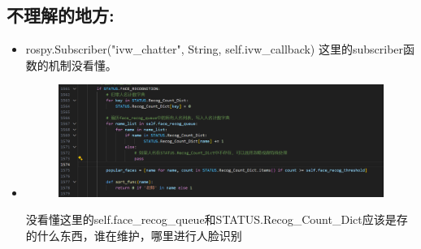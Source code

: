 \documentclass[]{article}
\begin{document}
\subsection{\textcolor{mycolor}{不理解的地方:}}
\begin{itemize}
	\item rospy.Subscriber("ivw\_chatter", String, self.ivw\_callback) 这里的subscriber函数的机制没看懂。
	\item \begin{figure}[h]
		\centering
		\includegraphics[width=0.7\linewidth]{screenshot002}
		\label{fig:screenshot002}
	\end{figure}
	没看懂这里的self.face\_recog\_queue和STATUS.Recog\_Count\_Dict应该是存的什么东西，谁在维护，哪里进行人脸识别
	
\end{itemize}	
\end{document}
